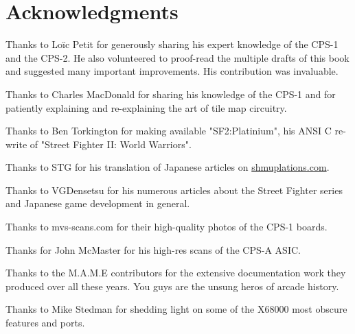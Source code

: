 \chapter*{Acknowledgments} 

Thanks to Lo\"{i}c Petit for generously sharing his expert knowledge of the CPS-1 and the CPS-2. He also volunteered to proof-read the multiple drafts of this book and suggested many important improvements. His contribution was invaluable.

Thanks to Charles MacDonald for sharing his knowledge of the CPS-1 and for patiently explaining and re-explaining the art of tile map circuitry.

Thanks to Ben Torkington for making available "SF2:Platinium", his ANSI C re-write of "Street Fighter II: World Warriors".

Thanks to STG for his translation of Japanese articles on \href{https://shmuplations.com}{shmuplations.com}.

Thanks to VGDensetsu for his numerous articles about the Street Fighter series and Japanese game development in general.

Thanks to mvs-scans.com for their high-quality photos of the CPS-1 boards.

Thanks for John McMaster for his high-res scans of the CPS-A ASIC.

Thanks to the M.A.M.E contributors for the extensive documentation work they produced over all these years. You guys are the unsung heros of arcade history.

Thanks to Mike Stedman for shedding light on some of the X68000 most obscure features and ports.